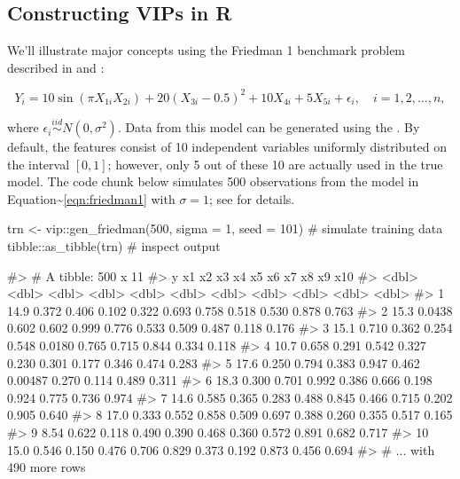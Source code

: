 \hypertarget{constructing-vips-in-r}{%
\subsection{Constructing VIPs in R}\label{constructing-vips-in-r}}

We'll illustrate major concepts using the Friedman 1 benchmark problem
described in \citet{multivariate-friedman-1991} and
\citet{bagging-breiman-1996}:

\begin{equation}
  Y_i = 10 \sin\left(\pi X_{1i} X_{2i}\right) + 20 \left(X_{3i} - 0.5\right) ^ 2 + 10 X_{4i} + 5 X_{5i} + \epsilon_i, \quad i = 1, 2, \dots, n,
\label{eqn:friedman1}
\end{equation}

where \(\epsilon_i \stackrel{iid}{\sim} N\left(0, \sigma^2\right)\).
Data from this model can be generated using the
. By default, the features consist of 10
independent variables uniformly distributed on the interval
\(\left[0,1\right]\); however, only 5 out of these 10 are actually used
in the true model. The code chunk below simulates 500 observations from
the model in Equation\textasciitilde{}\eqref{eqn:friedman1} with
\(\sigma = 1\); see  for details.

\begin{Schunk}
\begin{Sinput}
trn <- vip::gen_friedman(500, sigma = 1, seed = 101)  # simulate training data
tibble::as_tibble(trn)  # inspect output
\end{Sinput}
\begin{Soutput}
#> # A tibble: 500 x 11
#>        y     x1    x2    x3    x4     x5      x6    x7    x8    x9   x10
#>    <dbl>  <dbl> <dbl> <dbl> <dbl>  <dbl>   <dbl> <dbl> <dbl> <dbl> <dbl>
#>  1 14.9  0.372  0.406 0.102 0.322 0.693  0.758   0.518 0.530 0.878 0.763
#>  2 15.3  0.0438 0.602 0.602 0.999 0.776  0.533   0.509 0.487 0.118 0.176
#>  3 15.1  0.710  0.362 0.254 0.548 0.0180 0.765   0.715 0.844 0.334 0.118
#>  4 10.7  0.658  0.291 0.542 0.327 0.230  0.301   0.177 0.346 0.474 0.283
#>  5 17.6  0.250  0.794 0.383 0.947 0.462  0.00487 0.270 0.114 0.489 0.311
#>  6 18.3  0.300  0.701 0.992 0.386 0.666  0.198   0.924 0.775 0.736 0.974
#>  7 14.6  0.585  0.365 0.283 0.488 0.845  0.466   0.715 0.202 0.905 0.640
#>  8 17.0  0.333  0.552 0.858 0.509 0.697  0.388   0.260 0.355 0.517 0.165
#>  9  8.54 0.622  0.118 0.490 0.390 0.468  0.360   0.572 0.891 0.682 0.717
#> 10 15.0  0.546  0.150 0.476 0.706 0.829  0.373   0.192 0.873 0.456 0.694
#> # ... with 490 more rows
\end{Soutput}
\end{Schunk}

